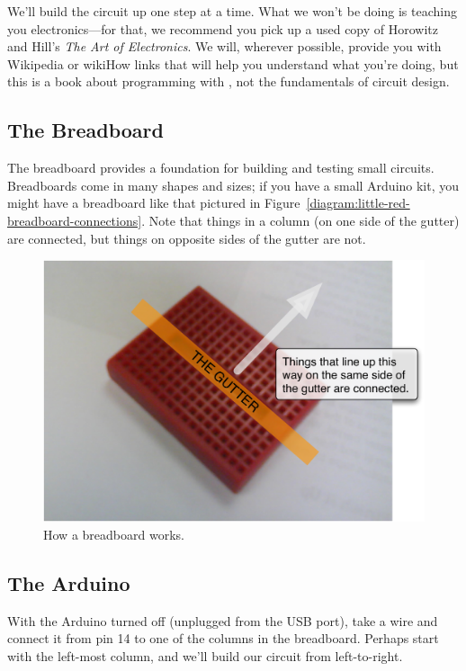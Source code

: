 We'll build the circuit up one step at a time. What we won't be doing is teaching you electronics---for that, we recommend you pick up a used copy of Horowitz and Hill's {\em The Art of Electronics}. We will, wherever possible, provide you with Wikipedia or wikiHow links that will help you understand what you're doing, but this is a book about programming with \plumbing, not the fundamentals of circuit design.

\subsection{The Breadboard}
The breadboard provides a foundation for building and testing small circuits. Breadboards come in many shapes and sizes; if you have a small Arduino kit, you might have a breadboard like that pictured in Figure~\vref{diagram:little-red-breadboard-connections}. Note that things in a column (on one side of the gutter) are connected, but things on opposite sides of the gutter are not. 

\begin{figure}[h!]
  \begin{center}
    \includegraphics[width=0.8\linewidth]{images/little-red-breadboard-connections}
    \caption{How a breadboard works.}
    \label{diagram:little-red-breadboard-connections}
  \end{center}
\end{figure}

\subsection{The Arduino}
With the Arduino turned off (unplugged from the USB port), take a wire and connect it from pin 14 to one of the columns in the breadboard. Perhaps start with the left-most column, and we'll build our circuit from left-to-right.

